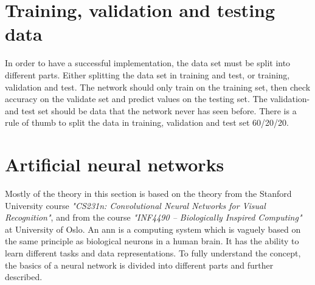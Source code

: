 \documentclass[USenglish]{ifimaster}  %
\begin{document}
\section{Training, validation and testing data}
In order to have a successful implementation, the data set must be split into different parts. Either splitting the data set in training and test, or training, validation and test. The network should only train on the training set, then check accuracy on the validate set and predict values on the testing set. The validation- and test set should be data that the network never has seen before. There is a rule of thumb to split the data in training, validation and test set 60/20/20.  
\newpage
\section{Artificial neural networks}
Mostly of the theory in this section is based on the theory from the Stanford University course \textit{"CS231n: Convolutional Neural Networks for Visual Recognition"}\cite{website:cs231n}, and from the course \textit{"INF4490 – Biologically Inspired Computing"}\cite{website:inf_4490_slp}\cite{website:inf_4490_mlp} at University of Oslo.
\newline
\newline
An \ac{ann} is a computing system which is vaguely based on the same principle as biological neurons in a human brain. It has the ability to learn different tasks and data representations. To fully understand the concept, the basics of a neural network is divided into different parts and further described.
\newline
\newline
\end{document}
